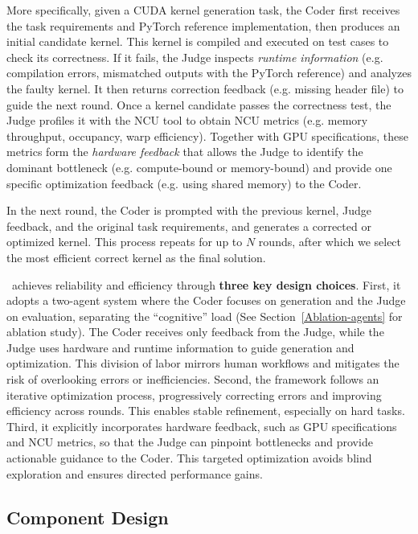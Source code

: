 More specifically, given a CUDA kernel generation task, the Coder first receives the task requirements and PyTorch reference implementation, then produces an initial candidate kernel.  
This kernel is compiled and executed on test cases to check its correctness.  
If it fails, the Judge inspects {\it runtime information} (e.g. compilation errors, mismatched outputs with the PyTorch reference) and analyzes the faulty kernel. It then returns {correction feedback} (e.g. missing header file) to guide the next round. Once a kernel candidate passes the  correctness test, the Judge profiles it with the NCU tool to obtain {NCU metrics} (e.g. memory throughput, occupancy, warp efficiency).  
Together with {GPU specifications}, these metrics form the {\it hardware feedback} that allows the Judge to identify the dominant bottleneck (e.g. compute-bound or memory-bound) and provide one specific {optimization feedback} (e.g. using shared memory) to the Coder.  


In the next round, the Coder is prompted with the previous kernel, Judge feedback, and the original task requirements, and generates a corrected or optimized kernel.  
This process repeats for up to $N$ rounds, after which we select the most efficient correct kernel as the final solution.

\agentname~achieves reliability and efficiency through {\bf three key design choices}.
First, it adopts a two-agent system where the Coder focuses on generation and the Judge on evaluation, separating the “cognitive” load (See Section~\ref{Ablation-agents} for ablation study). The Coder receives only feedback from the Judge, while the Judge uses hardware and runtime information to guide generation and optimization. This division of labor mirrors human workflows and mitigates the risk of overlooking errors or inefficiencies.
Second, the framework follows an iterative optimization process, progressively correcting errors and improving efficiency across rounds. This enables stable refinement, especially on hard tasks.
Third, it explicitly incorporates hardware feedback, such as GPU specifications and NCU metrics, so that the Judge can pinpoint bottlenecks and provide actionable guidance to the Coder. This targeted optimization avoids blind exploration and ensures directed performance gains. 

\vspace{-10pt}
\subsection{Component Design}
\vspace{-4pt}
